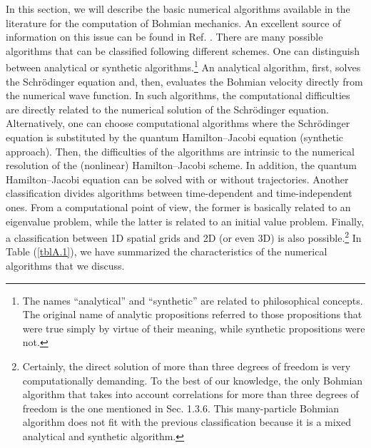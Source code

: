 \documentclass[nofootinbib, secnumarabic, amsmath, nobibnotes,10pt,aps,pra]{revtex4-1}
\newcommand{\tref}[1]{Table (\ref{#1})}
\begin{document}
In this section, we will describe the basic numerical algorithms
available in the literature for the computation of Bohmian
mechanics. An excellent source of information on this issue can be
found in Ref. \cite{om.wyatt2005}. There are many possible
algorithms that can be classified following different schemes.
One can distinguish between analytical or synthetic algorithms.\footnote{The names ``analytical'' and ``synthetic'' are related to philosophical concepts. The original name of analytic propositions referred to those propositions that were true simply by virtue of their meaning, while synthetic propositions were not.}
An analytical algorithm, first, solves the Schr\"odinger equation and, then, evaluates the Bohmian velocity directly from the numerical wave function. In such algorithms, the computational difficulties are directly related to the numerical solution of the Schr\"odinger equation. Alternatively, one can choose computational algorithms where the Schr\"odinger equation is substituted by the quantum Hamilton--Jacobi equation (synthetic approach). Then, the difficulties of the algorithms are intrinsic to the numerical resolution of the (nonlinear) Hamilton--Jacobi scheme. In addition,
the quantum Hamilton--Jacobi equation can be solved with or without trajectories. Another classification divides
algorithms between time-dependent and time-independent ones. From a computational point of view, the
former is basically related to an eigenvalue problem, while the latter is related to an initial
value problem. Finally, a classification between 1D spatial grids and 2D (or even 3D)
is also possible.\footnote{Certainly, the direct solution of more than three degrees of freedom is very computationally demanding. To the best of our knowledge, the only Bohmian algorithm that takes into account correlations for more than three degrees of freedom is the one mentioned in Sec. 1.3.6.     
This many-particle Bohmian algorithm does not fit with the previous
classification because it is a mixed analytical and synthetic
algorithm.} In \tref{tblA.1}, we have summarized the characteristics
of the numerical algorithms that we discuss.
\end{document}
